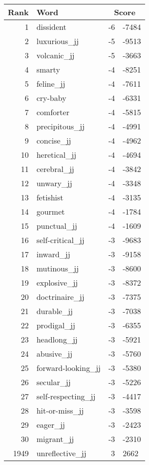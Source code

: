 \begin{longtable}[!htbp]{| rlr@{.}l |}
    \hline
    \textbf{Rank} & \textbf{Word} & \multicolumn{2}{c|}{\textbf{Score}} \\
    \hline
    \endhead
    1 & dissident & -6 & -7484 \\
    2 & luxurious\_jj & -5 & -9513 \\
    3 & volcanic\_jj & -5 & -3663 \\
    4 & smarty & -4 & -8251 \\
    5 & feline\_jj & -4 & -7611 \\
    6 & cry-baby & -4 & -6331 \\
    7 & comforter & -4 & -5815 \\
    8 & precipitous\_jj & -4 & -4991 \\
    9 & concise\_jj & -4 & -4962 \\
    10 & heretical\_jj & -4 & -4694 \\
    11 & cerebral\_jj & -4 & -3842 \\
    12 & unwary\_jj & -4 & -3348 \\
    13 & fetishist & -4 & -3135 \\
    14 & gourmet & -4 & -1784 \\
    15 & punctual\_jj & -4 & -1609 \\
    16 & self-critical\_jj & -3 & -9683 \\
    17 & inward\_jj & -3 & -9158 \\
    18 & mutinous\_jj & -3 & -8600 \\
    19 & explosive\_jj & -3 & -8372 \\
    20 & doctrinaire\_jj & -3 & -7375 \\
    21 & durable\_jj & -3 & -7038 \\
    22 & prodigal\_jj & -3 & -6355 \\
    23 & headlong\_jj & -3 & -5921 \\
    24 & abusive\_jj & -3 & -5760 \\
    25 & forward-looking\_jj & -3 & -5380 \\
    26 & secular\_jj & -3 & -5226 \\
    27 & self-respecting\_jj & -3 & -4417 \\
    28 & hit-or-miss\_jj & -3 & -3598 \\
    29 & eager\_jj & -3 & -2423 \\
    30 & migrant\_jj & -3 & -2310 \\
    1949 & unreflective\_jj & 3 & 2662 \\

\end{longtable}
